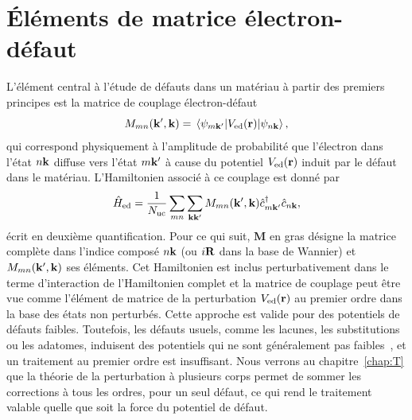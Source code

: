 \section{Éléments de matrice électron-défaut}\label{sec:M_défaut}

L'élément central à l'étude de défauts dans un matériau à partir des premiers principes est la matrice de couplage électron-défaut
\begin{equation}
    M_{mn}(\kv',\kv) = \matrixel{\psi_{m\kv'}}{V_\text{ed}(\rv)}{\psi_{n\kv}},\label{eqn:M}
\end{equation}
qui correspond physiquement à l'amplitude de probabilité que l'électron dans l'état $n\mathbf{k}$ diffuse vers l'état $m\mathbf{k}'$ à cause du potentiel $V_\text{ed}(\mathbf{r})$ induit par le défaut dans le matériau. L'Hamiltonien associé à ce couplage est donné par
\begin{equation}
    \hat{H}_\text{ed} = \frac{1}{N_\text{uc}}\sum_{mn}\sum_{\mathbf{k}\mathbf{k}'}M_{mn}(\mathbf{k}',\mathbf{k})\hat{c}^\dag_{m\mathbf{k}'}\hat{c}_{n\mathbf{k}},
\end{equation}
écrit en deuxième quantification. Pour ce qui suit, $\bm M$ en gras désigne la matrice complète dans l'indice composé $n\mathbf{k}$ (ou $i\mathbf{R}$ dans la base de Wannier) et $M_{mn}(\mathbf{k}',\mathbf{k})$ ses éléments. Cet Hamiltonien est inclus perturbativement dans le terme d'interaction de l'Hamiltonien complet et la matrice de couplage peut être vue comme l'élément de matrice de la perturbation $V_\text{ed}(\mathbf{r})$ au premier ordre dans la base des états non perturbés. Cette approche est valide pour des potentiels de défauts faibles. Toutefois, les défauts usuels, comme les lacunes, les substitutions ou les adatomes, induisent des potentiels qui ne sont généralement pas faibles~\cite{banhartStructuralDefectsGraphene2011}, et un traitement au premier ordre est insuffisant. Nous verrons au chapitre~\ref{chap:T} que la théorie de la perturbation à plusieurs corps permet de sommer les corrections à tous les ordres, pour un seul défaut, ce qui rend le traitement valable quelle que soit la force du potentiel de défaut.

